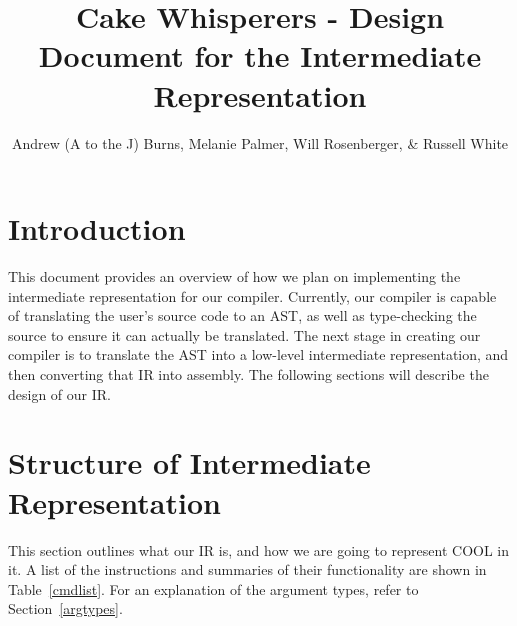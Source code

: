 \documentclass[10pt, onecolumn]{extarticle}
\title{Cake Whisperers - Design Document for the Intermediate Representation}
\author{Andrew (A to the J) Burns,  Melanie Palmer, Will Rosenberger, \& Russell White}
\date{}
\begin{document}
\maketitle{}

\tableofcontents

\section{Introduction} %
This document provides an overview of how we plan on implementing the intermediate representation for our compiler. Currently, our compiler is capable of translating the user's source code to an AST, as well as type-checking the source to ensure it can actually be translated. The next stage in creating our compiler is to translate the AST into a low-level intermediate representation, and then converting that IR into assembly. The following sections will describe the design of our IR.

\section{Structure of Intermediate Representation}
This section outlines what our IR is, and how we are going to represent COOL in it. A list of the instructions and
summaries of their functionality are shown in Table~\ref{cmdlist}. For an explanation of the argument types, refer
to Section~\ref{argtypes}.
\end{document}
